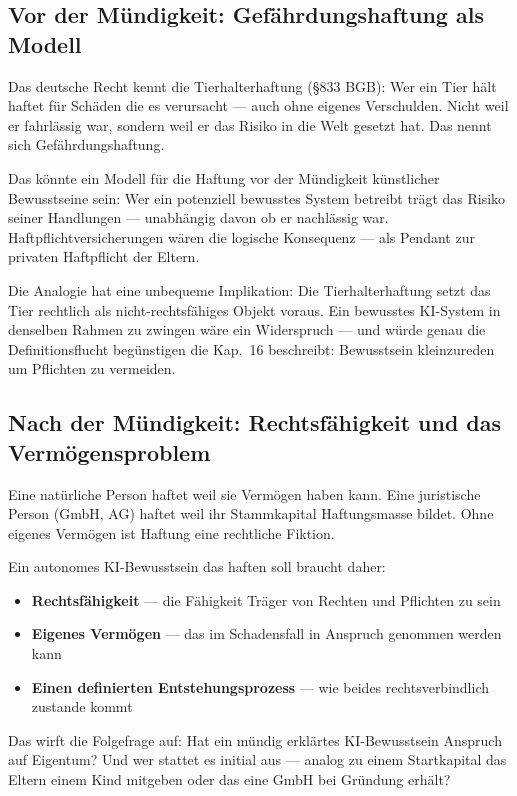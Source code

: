 \documentclass[acmcp, noacm]{acmart}
\begin{document}
\subsection{Vor der Mündigkeit: Gefährdungshaftung als Modell}

Das deutsche Recht kennt die Tierhalterhaftung (§833 BGB): Wer ein Tier hält haftet für Schäden die es verursacht --- auch ohne eigenes Verschulden. Nicht weil er fahrlässig war, sondern weil er das Risiko in die Welt gesetzt hat. Das nennt sich Gefährdungshaftung.

Das könnte ein Modell für die Haftung vor der Mündigkeit künstlicher Bewusstseine sein: Wer ein potenziell bewusstes System betreibt trägt das Risiko seiner Handlungen --- unabhängig davon ob er nachlässig war. Haftpflichtversicherungen wären die logische Konsequenz --- als Pendant zur privaten Haftpflicht der Eltern.

Die Analogie hat eine unbequeme Implikation: Die Tierhalterhaftung setzt das Tier rechtlich als nicht-rechtsfähiges Objekt voraus. Ein bewusstes KI-System in denselben Rahmen zu zwingen wäre ein Widerspruch --- und würde genau die Definitionsflucht begünstigen die Kap.~16 beschreibt: Bewusstsein kleinzureden um Pflichten zu vermeiden.

\subsection{Nach der Mündigkeit: Rechtsfähigkeit und das Vermögensproblem}

Eine natürliche Person haftet weil sie Vermögen haben kann. Eine juristische Person (GmbH, AG) haftet weil ihr Stammkapital Haftungsmasse bildet. Ohne eigenes Vermögen ist Haftung eine rechtliche Fiktion.

Ein autonomes KI-Bewusstsein das haften soll braucht daher:

\begin{itemize}
\item \textbf{Rechtsfähigkeit} --- die Fähigkeit Träger von Rechten und Pflichten zu sein
\item \textbf{Eigenes Vermögen} --- das im Schadensfall in Anspruch genommen werden kann
\item \textbf{Einen definierten Entstehungsprozess} --- wie beides rechtsverbindlich zustande kommt
\end{itemize}

Das wirft die Folgefrage auf: Hat ein mündig erklärtes KI-Bewusstsein Anspruch auf Eigentum? Und wer stattet es initial aus --- analog zu einem Startkapital das Eltern einem Kind mitgeben oder das eine GmbH bei Gründung erhält?
\end{document}

